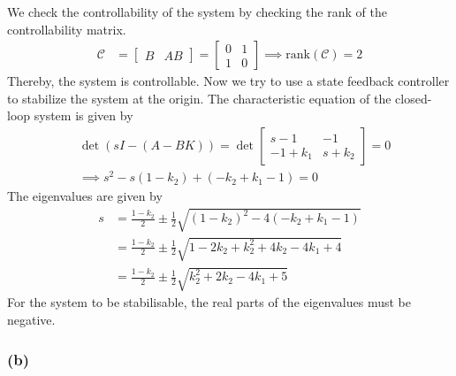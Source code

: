We check the controllability of the system by checking the rank of the controllability matrix.
\begin{align*}
    \mathcal{C}
     & =
    \begin{bmatrix}
        B & AB
    \end{bmatrix}
    =
    \begin{bmatrix}
        0 & 1 \\
        1 & 0
    \end{bmatrix}
    \implies
    \text{rank}(\mathcal{C}) = 2
\end{align*}
Thereby, the system is controllable.
Now we try to use a state feedback controller to stabilize the system at the origin.
The characteristic equation of the closed-loop system is given by
\begin{align*}
     &
    \det(sI-(A-BK))
    =
    \det
    \begin{bmatrix}
        s-1      & -1      \\
        -1+k_{1} & s+k_{2}
    \end{bmatrix}
    =
    0
    \\ &
    \implies
    s^2 - s(1-k_2) + (-k_2 + k_1 - 1) = 0
\end{align*}
The eigenvalues are given by
\begin{align*}
    s
     & =
    \frac{1-k_2}{2} \pm \frac{1}{2} \sqrt{{(1-k_2)}^2 - 4(-k_2 + k_1 - 1)}
    \\ & =
    \frac{1-k_2}{2} \pm \frac{1}{2} \sqrt{1 - 2k_2 + k_2^2 + 4k_2 - 4k_1 + 4}
    \\ & =
    \frac{1-k_2}{2} \pm \frac{1}{2} \sqrt{k_2^2 + 2k_2 - 4k_1 + 5}
\end{align*}
For the system to be stabilisable, the real parts of the eigenvalues must be negative.

\subsubsection*{(b)}

